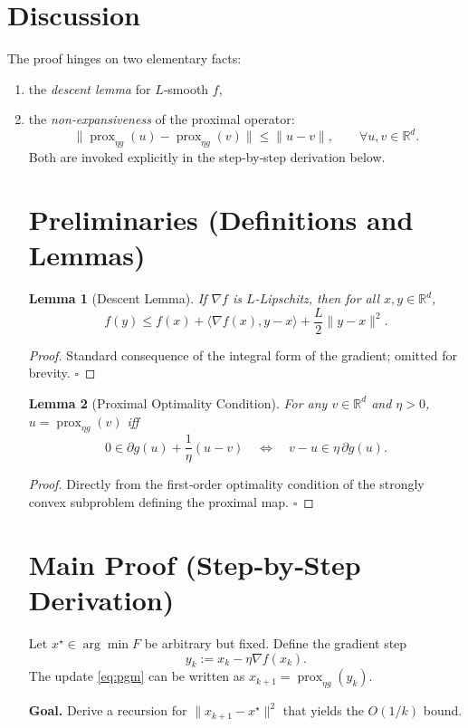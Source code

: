 \documentclass[11pt]{article}
\newtheorem{lemma}{Lemma}
\newcommand{\prox}{\operatorname{prox}}
\newcommand{\R}{\mathbb{R}}
\begin{document}
\section*{Discussion}
The proof hinges on two elementary facts:
\begin{enumerate}[label={(\alph*)}]
\item the \emph{descent lemma} for $L$‑smooth $f$,
\item the \emph{non‑expansiveness} of the proximal operator:
\[
\|\prox_{\eta g}(u)-\prox_{\eta g}(v)\|\le\|u-v\|,\qquad\forall u,v\in\R^{d}. \tag{NE}
\]
Both are invoked explicitly in the step‑by‑step derivation below.

\newpage
\section*{Preliminaries (Definitions and Lemmas)}
\begin{lemma}[Descent Lemma]\label{lem:descent}
If $\nabla f$ is $L$‑Lipschitz, then for all $x,y\in\R^{d}$,
\[
f(y)\le f(x)+\langle\nabla f(x),y-x\rangle+\frac{L}{2}\|y-x\|^{2}.
\tag{DL}
\]
\end{lemma}
\begin{proof}
Standard consequence of the integral form of the gradient; omitted for brevity. \hfill $\square$
\end{proof}

\begin{lemma}[Proximal Optimality Condition]\label{lem:prox-opt}
For any $v\in\R^{d}$ and $\eta>0$, $u=\prox_{\eta g}(v)$ iff
\[
0\in\partial g(u)+\frac{1}{\eta}(u-v)
\quad\Longleftrightarrow\quad
v-u\in\eta\,\partial g(u).
\tag{PO}
\]
\end{lemma}
\begin{proof}
Directly from the first‑order optimality condition of the strongly convex subproblem defining the proximal map. \hfill $\square$
\end{proof}

\section*{Main Proof (Step‑by‑Step Derivation)}
Let $x^{\star}\in\arg\min F$ be arbitrary but fixed. Define the gradient step
\[
y_{k}:=x_{k}-\eta\nabla f(x_{k}).
\]
The update \eqref{eq:pgm} can be written as $x_{k+1}=\prox_{\eta g}(y_{k})$.

\noindent\textbf{Goal.} Derive a recursion for $\|x_{k+1}-x^{\star}\|^{2}$ that yields the $O(1/k)$ bound.


\end{enumerate}
\end{document}
